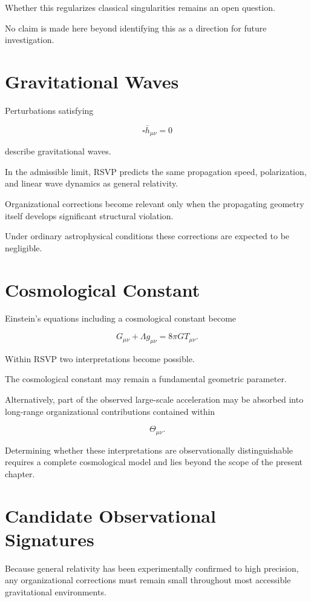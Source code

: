 \documentclass[11pt,oneside]{book}
\numberwithin{equation}{chapter}
\theoremstyle{definition}
\theoremstyle{plain}
\begin{document}
Whether this regularizes classical singularities remains an open question.

No claim is made here beyond identifying this as a direction for future
investigation.

\section{Gravitational Waves}

Perturbations satisfying

\[
\square
\bar h_{\mu\nu}
=
0
\]

describe gravitational waves.

In the admissible limit, RSVP predicts the same propagation speed,
polarization, and linear wave dynamics as general relativity.

Organizational corrections become relevant only when the propagating
geometry itself develops significant structural violation.

Under ordinary astrophysical conditions these corrections are expected to be
negligible.

\section{Cosmological Constant}

Einstein's equations including a cosmological constant become

\[
G_{\mu\nu}
+
\Lambda
g_{\mu\nu}
=
8\pi G
T_{\mu\nu}.
\]

Within RSVP two interpretations become possible.

The cosmological constant may remain a fundamental geometric parameter.

Alternatively, part of the observed large-scale acceleration may be absorbed
into long-range organizational contributions contained within

\[
\Theta_{\mu\nu}.
\]

Determining whether these interpretations are observationally
distinguishable requires a complete cosmological model and lies beyond the
scope of the present chapter.

\section{Candidate Observational Signatures}

Because general relativity has been experimentally confirmed to high
precision, any organizational corrections must remain small throughout most
accessible gravitational environments.
\end{document}
